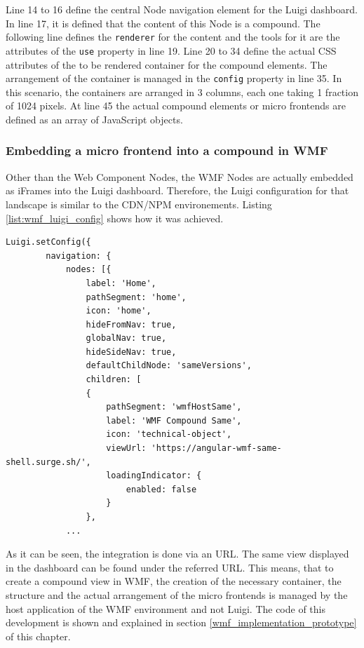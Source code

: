 Line 14 to 16 define the central Node navigation element for the Luigi dashboard. 
In line 17, it is defined that the content of this Node is a compound. 
The following line defines the \texttt{renderer} for the content and the tools for it are the attributes of the \texttt{use} property in line 19. 
Line 20 to 34 define the actual CSS attributes of the to be rendered container for the compound elements. 
The arrangement of the container  is managed in the \texttt{config} property in line 35. 
In this scenario, the containers are arranged in 3 columns, each one taking 1 fraction of 1024 pixels.
At line 45 the actual compound elements or micro frontends are defined as an array of JavaScript objects.

\subsubsection{Embedding a micro frontend into a compound in WMF}
\label{embedd_mfe_in_wmf}

Other than the Web Component Nodes, the WMF Nodes are actually embedded as iFrames into the Luigi dashboard.
Therefore, the Luigi configuration for that landscape is similar to the CDN/NPM environements. 
Listing \ref{list:wmf_luigi_config} shows how it was achieved.
\newpage
\begin{lstlisting}[caption=Example configuration to embed a WMF micro frontend compound as a Node in Luigi, label=list:wmf_luigi_config,  xleftmargin=.0\textwidth, xrightmargin=.0\textwidth]
	Luigi.setConfig({
		navigation: {
			nodes: [{
				label: 'Home',
				pathSegment: 'home',
				icon: 'home',
				hideFromNav: true,
				globalNav: true,
				hideSideNav: true,
				defaultChildNode: 'sameVersions',
				children: [
                {
					pathSegment: 'wmfHostSame',
					label: 'WMF Compound Same',
					icon: 'technical-object',
					viewUrl: 'https://angular-wmf-same-shell.surge.sh/',
					loadingIndicator: {
						enabled: false
					}
				},
			...
\end{lstlisting}

As it can be seen, the integration is done via an URL. 
The same view displayed in the dashboard can be found under the referred URL. 
This means, that to create a compound view in WMF, the creation of the necessary container, the structure and the actual arrangement of the micro frontends is managed by the host application of the WMF environment and not Luigi.
The code of this development is shown and explained in section \ref{wmf_implementation_prototype} of this chapter.

